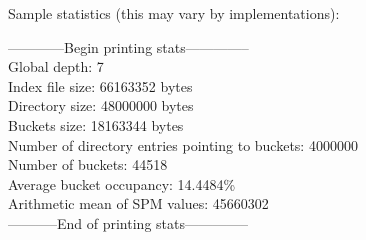 \documentclass[10pt]{article}
\begin{document}
\vspace{2em}
Sample statistics (this may vary by implementations):
\begin{framed}
  \noindent
  ------------Begin printing stats--------------\\
  Global depth: 7\\
  Index file size: 66163352 bytes\\
  Directory size: 48000000 bytes\\
  Buckets size: 18163344 bytes\\
  Number of directory entries pointing to buckets: 4000000\\
  Number of buckets: 44518\\
  Average bucket occupancy: 14.4484\%\\
  Arithmetic mean of SPM values: 45660302\\
  -----------End of printing stats--------------\\
  \noindent
\end{framed}
\end{document}
